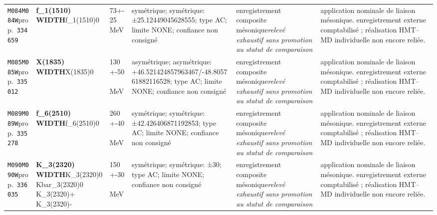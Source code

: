 \begin{landscape}
\begin{longtable}{L{1.85cm}L{4.45cm}L{2.35cm}L{4.05cm}L{3.35cm}L{7.15cm}}
\texttt{M084}\newline \texttt{M084W}\newline prop.\ \texttt{334659} & \textbf{f\_\allowbreak{}1(1510) WIDTH}\newline f\_\allowbreak{}1(1510)0 & 73+-25\,MeV & symétrique; symétrique: ±25.12449045628555; type AC; limite NONE; confiance non consigné & enregistrement composite mésonique\newline \emph{relevé exhaustif sans promotion au statut de comparaison} & application nominale de liaison mésonique. enregistrement externe comptabilisé ; réalisation HMT--MD individuelle non encore reliée. \\
\texttt{M085}\newline \texttt{M085W}\newline prop.\ \texttt{335012} & \textbf{X(1835) WIDTH}\newline X(1835)0 & 130+-50\,MeV & asymétrique; asymétrique: +46.521424857963467/-48.805761882116528; type AC; limite NONE; confiance non consigné & enregistrement composite mésonique\newline \emph{relevé exhaustif sans promotion au statut de comparaison} & application nominale de liaison mésonique. enregistrement externe comptabilisé ; réalisation HMT--MD individuelle non encore reliée. \\
\texttt{M089}\newline \texttt{M089W}\newline prop.\ \texttt{335278} & \textbf{f\_\allowbreak{}6(2510) WIDTH}\newline f\_\allowbreak{}6(2510)0 & 260+-40\,MeV & symétrique; symétrique: ±42.426406871192853; type AC; limite NONE; confiance non consigné & enregistrement composite mésonique\newline \emph{relevé exhaustif sans promotion au statut de comparaison} & application nominale de liaison mésonique. enregistrement externe comptabilisé ; réalisation HMT--MD individuelle non encore reliée. \\
\texttt{M090}\newline \texttt{M090W}\newline prop.\ \texttt{336035} & \textbf{K\_\allowbreak{}3(2320) WIDTH}\newline K\_\allowbreak{}3(2320)0 \textbar{}\allowbreak{} Kbar\_\allowbreak{}3(2320)0 \textbar{}\allowbreak{} K\_\allowbreak{}3(2320)+ \textbar{}\allowbreak{} K\_\allowbreak{}3(2320)- & 150+-30\,MeV & symétrique; symétrique: ±30; type AC; limite NONE; confiance non consigné & enregistrement composite mésonique\newline \emph{relevé exhaustif sans promotion au statut de comparaison} & application nominale de liaison mésonique. enregistrement externe comptabilisé ; réalisation HMT--MD individuelle non encore reliée. \\

\end{longtable}
\end{landscape}
